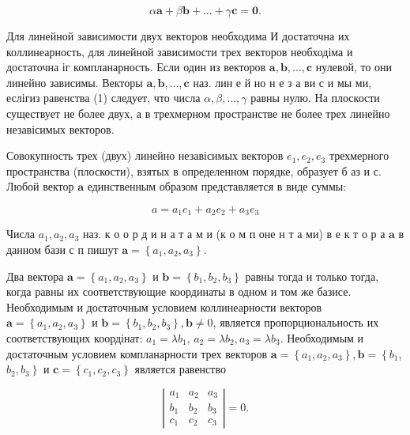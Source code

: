 \documentclass[10pt]{article}
\begin{document}
\[

\alpha \boldsymbol{a}+\beta \boldsymbol{b}+\ldots+\gamma \boldsymbol{c}=\mathbf{0} .

\]



Для линейной зависимости двух векторов необходима И достаточна их коллинеарность, для линейной зависимости трех векторов необходіма и достаточна іг компланарность. Если один из векторов $\boldsymbol{a}, \boldsymbol{b}, \ldots, \boldsymbol{c}$ нулевой, то они линейно зависимы. Векторы $\boldsymbol{a}, \boldsymbol{b}, \ldots, \boldsymbol{c}$ наз. лин е й но н е з а ви с и мы ми, еслігиз равенства (1) следует, что числа $\alpha, \beta, \ldots, \gamma$ равны нулю. На плоскости существует не более двух, а в трехмерном пространстве не более трех линейно незавісимых векторов.



Совокупность трех (двух) линейно незавісимых векторов $e_{1}, e_{2}, e_{3}$ трехмерного пространства (плоскости), взятых в определенном порядке, образует б аз и с. Любой вектор $\boldsymbol{a}$ единственным образом представляется в виде суммы:



\[

a=a_{1} e_{1}+a_{2} e_{2}+a_{3} e_{3}

\]



Числа $a_{1}, a_{2}, a_{3}$ наз. к о о р д и н а т а м и (к о м п оне н т а ми) в е к т о р а $\boldsymbol{a}$ в данном бази с п пишут $\boldsymbol{a}=\left\{a_{1}, a_{2}, a_{3}\right\}$.



Два вектора $\boldsymbol{a}=\left\{a_{1}, a_{2}, a_{3}\right\}$ и $\boldsymbol{b}=\left\{b_{1}, b_{2}, b_{3}\right\}$ равны тогда и только тогда, когда равны их соответствующие координаты в одном и том же базисе. Необходимым и достаточным условием коллинеарности векторов $\boldsymbol{a}=\left\{a_{1}, a_{2}, a_{3}\right\}$ и $\boldsymbol{b}=\left\{b_{1}, b_{2}, b_{3}\right\}, \boldsymbol{b} \neq 0$, является пропорциональность их соответствующих коордінат: $a_{1}=\lambda b_{1}$, $a_{2}=\lambda b_{2}, a_{3}=\lambda b_{3}$. Необходимым и достаточным условием компланарности трех векторов $\boldsymbol{a}=\left\{a_{1}, a_{2}, a_{3}\right\}, \boldsymbol{b}=\left\{b_{1}\right.$, $\left.b_{2}, b_{3}\right\}$ и $\boldsymbol{c}=\left\{c_{1}, c_{2}, c_{3}\right\}$ является равенство



\[

\left|\begin{array}{ccc}

a_{1} & a_{2} & a_{3} \\

b_{1} & b_{2} & b_{3} \\

c_{1} & c_{2} & c_{3}

\end{array}\right|=0 .

\]
\end{document}
